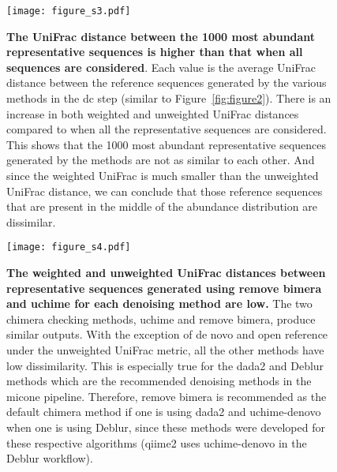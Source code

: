     \begin{figure}[H]
      \centering
      \texttt{[image: figure\_s3.pdf]}
    \end{figure}
    \begin{figure}[H]
      \centering
        \caption{
          \textbf{The UniFrac distance between the 1000 most abundant representative sequences is higher than that when all sequences are considered}.
          Each value is the average UniFrac distance between the reference sequences generated by the various methods in the \ac{dc} step (similar to Figure~\ref{fig:figure2}).
          There is an increase in both weighted and unweighted UniFrac distances compared to when all the representative sequences are considered.
          This shows that the 1000 most abundant representative sequences generated by the methods are not as similar to each other.
          And since the weighted UniFrac is much smaller than the unweighted UniFrac distance, we can conclude that those reference sequences that are present in the middle of the abundance distribution are dissimilar.
        }
      \label{fig:figure_s3}
    \end{figure}
    \FloatBarrier
    \newpage

    \begin{figure}[H]
      \centering
      \texttt{[image: figure\_s4.pdf]}
    \end{figure}
    \begin{figure}[H]
      \centering
        \caption{
          \textbf{The weighted and unweighted UniFrac distances between representative sequences generated using remove bimera and uchime for each denoising method are low.}
          The two chimera checking methods, uchime and remove bimera, produce similar outputs.
          With the exception of de novo and open reference under the unweighted UniFrac metric, all the other methods have low dissimilarity.
          This is especially true for the \ac{dada2} and Deblur methods which are the recommended denoising methods in the \ac{micone} pipeline.
          Therefore, remove bimera is recommended as the default chimera method if one is using \ac{dada2} and uchime-denovo when one is using Deblur, since these methods were developed for these respective algorithms (\ac{qiime2} uses uchime-denovo in the Deblur workflow).
        }
      \label{fig:figure_s4}
    \end{figure}
    \FloatBarrier
    \newpage

